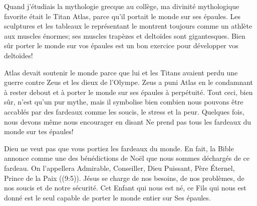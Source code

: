 

Quand j'étudiais la mythologie grecque au collège, ma divinité mythologique favorite était le Titan Atlas, parce qu'il portait le monde sur ses épaules. Les sculptures et les tableaux le représentant le montrent toujours comme un athlète aux muscles énormes; ses muscles trapèzes et deltoïdes sont gigantesques. Bien sûr porter le monde sur vos épaules est un bon exercice pour développer vos deltoïdes!

Atlas devait soutenir le monde parce que lui et les Titans avaient perdu une guerre contre Zeus et les dieux de l'Olympe. Zeus a puni Atlas en le condamnant à rester debout et à porter le monde sur ses épaules à perpétuité. Tout ceci, bien sûr, n'est qu'un pur mythe, mais il symbolise bien combien nous pouvons être accablés par des fardeaux comme les soucis, le stress et la peur. Quelques fois, nous devons même nous encourager en disant\frcolon{}
\Og Ne prend pas tous les fardeaux du monde sur tes épaules! \Fg{}

Dieu ne veut pas que vous portiez les fardeaux du monde. En fait, la Bible annonce comme une des bénédictions de Noël que nous sommes déchargés de ce fardeau. \Og On l’appellera Admirable, Conseiller, Dieu Puissant, Père Éternel, Prince de la Paix \Fg{} ((9:5)). Jésus se charge de nos besoins, de nos problèmes, de nos soucis et de notre sécurité. Cet Enfant qui nous est né, ce Fils qui nous est donné est le seul capable de porter le monde entier sur Ses épaules.

\begin{dvquotes}
\end{dvquotes}

